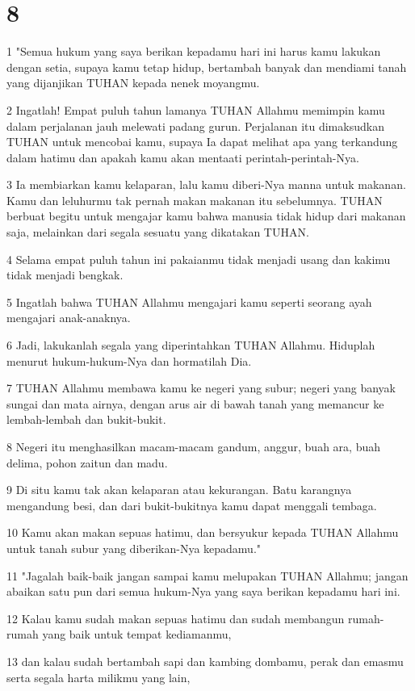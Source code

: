 \chapter{8}

\par 1 "Semua hukum yang saya berikan kepadamu hari ini harus kamu lakukan dengan setia, supaya kamu tetap hidup, bertambah banyak dan mendiami tanah yang dijanjikan TUHAN kepada nenek moyangmu.
\par 2 Ingatlah! Empat puluh tahun lamanya TUHAN Allahmu memimpin kamu dalam perjalanan jauh melewati padang gurun. Perjalanan itu dimaksudkan TUHAN untuk mencobai kamu, supaya Ia dapat melihat apa yang terkandung dalam hatimu dan apakah kamu akan mentaati perintah-perintah-Nya.
\par 3 Ia membiarkan kamu kelaparan, lalu kamu diberi-Nya manna untuk makanan. Kamu dan leluhurmu tak pernah makan makanan itu sebelumnya. TUHAN berbuat begitu untuk mengajar kamu bahwa manusia tidak hidup dari makanan saja, melainkan dari segala sesuatu yang dikatakan TUHAN.
\par 4 Selama empat puluh tahun ini pakaianmu tidak menjadi usang dan kakimu tidak menjadi bengkak.
\par 5 Ingatlah bahwa TUHAN Allahmu mengajari kamu seperti seorang ayah mengajari anak-anaknya.
\par 6 Jadi, lakukanlah segala yang diperintahkan TUHAN Allahmu. Hiduplah menurut hukum-hukum-Nya dan hormatilah Dia.
\par 7 TUHAN Allahmu membawa kamu ke negeri yang subur; negeri yang banyak sungai dan mata airnya, dengan arus air di bawah tanah yang memancur ke lembah-lembah dan bukit-bukit.
\par 8 Negeri itu menghasilkan macam-macam gandum, anggur, buah ara, buah delima, pohon zaitun dan madu.
\par 9 Di situ kamu tak akan kelaparan atau kekurangan. Batu karangnya mengandung besi, dan dari bukit-bukitnya kamu dapat menggali tembaga.
\par 10 Kamu akan makan sepuas hatimu, dan bersyukur kepada TUHAN Allahmu untuk tanah subur yang diberikan-Nya kepadamu."
\par 11 "Jagalah baik-baik jangan sampai kamu melupakan TUHAN Allahmu; jangan abaikan satu pun dari semua hukum-Nya yang saya berikan kepadamu hari ini.
\par 12 Kalau kamu sudah makan sepuas hatimu dan sudah membangun rumah-rumah yang baik untuk tempat kediamanmu,
\par 13 dan kalau sudah bertambah sapi dan kambing dombamu, perak dan emasmu serta segala harta milikmu yang lain,
